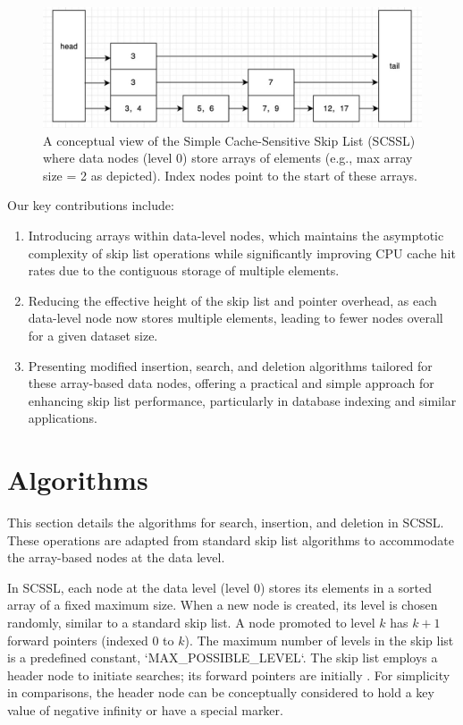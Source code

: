 \documentclass[sigconf]{acmart}
\begin{document}
\begin{figure}[htbp]
\centering
\includegraphics[width=0.9\columnwidth]{skiplist.png} %
\caption{A conceptual view of the Simple Cache-Sensitive Skip List (SCSSL) where data nodes (level 0) store arrays of elements (e.g., max array size = 2 as depicted). Index nodes point to the start of these arrays.}
\label{fig:conceptual_scssl}
\end{figure}

Our key contributions include:
\begin{enumerate}
    \item Introducing arrays within data-level nodes, which maintains the asymptotic complexity of skip list operations while significantly improving CPU cache hit rates due to the contiguous storage of multiple elements.
    \item Reducing the effective height of the skip list and pointer overhead, as each data-level node now stores multiple elements, leading to fewer nodes overall for a given dataset size.
    \item Presenting modified insertion, search, and deletion algorithms tailored for these array-based data nodes, offering a practical and simple approach for enhancing skip list performance, particularly in database indexing and similar applications.
\end{enumerate}

\section{Algorithms}
\label{sec:algorithms}
This section details the algorithms for search, insertion, and deletion in SCSSL. These operations are adapted from standard skip list algorithms to accommodate the array-based nodes at the data level.

In SCSSL, each node at the data level (level 0) stores its elements in a sorted array of a fixed maximum size. When a new node is created, its level is chosen randomly, similar to a standard skip list. A node promoted to level $k$ has $k+1$ forward pointers (indexed 0 to $k$). The maximum number of levels in the skip list is a predefined constant, `MAX_POSSIBLE_LEVEL`. The skip list employs a header node to initiate searches; its forward pointers are initially \Nil. For simplicity in comparisons, the header node can be conceptually considered to hold a key value of negative infinity or have a special marker.
\end{document}
